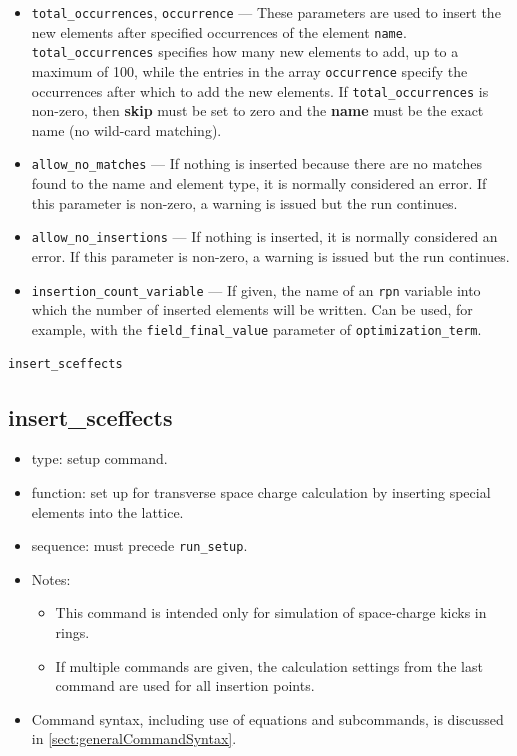 \documentclass[11pt]{article}
\begin{document}
\begin{itemize}
{\tt elegant} will recognize that the element already exists and use the previous definition.
\item \verb|total_occurrences|, \verb|occurrence| --- 
These parameters are used to insert the new elements after specified occurrences of 
the element \verb|name|.  \verb|total_occurrences| specifies how many new elements to add,
up to a maximum of 100, while the entries in the array \verb|occurrence| specify the occurrences
after which to add the new elements. If \verb|total_occurrences| is non-zero, then {\bf skip} must
be set to zero  and the {\bf name} must be the exact name (no wild-card matching). 
\item \verb|allow_no_matches| --- If nothing is inserted because there are no matches found to the name and element
  type, it is normally considered an error. If this parameter is non-zero, a warning is issued but the run continues.
\item \verb|allow_no_insertions| --- If nothing is inserted, it is normally considered an error. If this parameter is
  non-zero, a warning is issued but the run continues.
\item \verb|insertion_count_variable| --- If given, the name of an \verb|rpn| variable into which the number of
  inserted elements will be written. Can be used, for example, with the \verb|field_final_value| parameter of
  \verb|optimization_term|.
\end{itemize}

\newpage
\begin{center}{\Large\verb|insert_sceffects|}\end{center}
\subsection{insert\_sceffects \label{subsec:insertsceffects}}

\begin{itemize}
\item type: setup command.
\item function: set up for transverse space charge calculation by inserting special elements into the lattice.
\item sequence: must precede \verb|run_setup|.
\item Notes:
  \begin{itemize}
  \item This command is intended only for simulation of space-charge kicks in rings.
  \item If multiple commands are given, the calculation settings from the last command are used for
    all insertion points.
  \end{itemize}
\item Command syntax, including use of equations and subcommands, is discussed in \ref{sect:generalCommandSyntax}.
\end{itemize}
\end{document}
